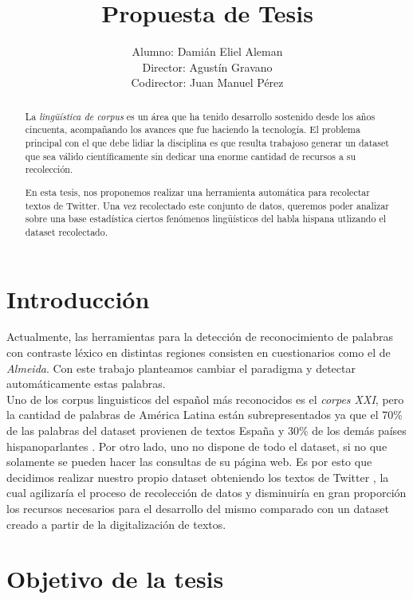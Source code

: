\documentclass[a4paper,11pt]{article}
\title{Propuesta de Tesis}
\author{Alumno: Damián Eliel Aleman \\
Director: Agustín Gravano \\
Codirector: Juan Manuel Pérez}
\begin{document}
\maketitle

\begin{abstract}

La \emph{lingüística de corpus} es un área que ha tenido desarrollo sostenido desde los años cincuenta, acompañando los avances que fue haciendo la tecnología. El problema principal con el que debe lidiar la disciplina es que resulta trabajoso generar un dataset que sea válido científicamente sin dedicar una enorme cantidad de recursos a su recolección.

En esta tesis, nos proponemos realizar una herramienta automática para recolectar textos de Twitter. Una vez recolectado este conjunto de datos, queremos poder analizar sobre una base estadística ciertos fenómenos lingüísticos del habla hispana utlizando el dataset recolectado.

\end{abstract}


\section*{Introducción}

Actualmente, las herramientas para la detección de reconocimiento de palabras con contraste léxico en distintas regiones %
consisten en cuestionarios como el de \emph{Almeida}\cite{ALMEIDA1995}. Con este trabajo planteamos cambiar el paradigma y detectar automáticamente estas palabras.\\

Uno de los corpus linguisticos del español más reconocidos es el \emph{corpes XXI}\cite{CORPES XXI}, pero la cantidad de palabras de América Latina están subrepresentados ya que el 70\% de las palabras del dataset provienen de textos España y 30\% de los demás países hispanoparlantes . Por otro lado, uno no dispone de todo el dataset, si no que solamente se pueden hacer las consultas de su página web.
Es por esto que decidimos realizar nuestro propio dataset obteniendo los textos de Twitter\cite{KILG2003} , la cual agilizaría el proceso de recolección de datos y disminuiría en gran proporción los recursos necesarios para el desarrollo del mismo comparado con un dataset creado a partir de la digitalización de textos.



\section*{Objetivo de la tesis}
\end{document}
